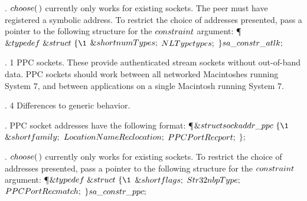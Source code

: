 . \CD{}$\\{choose}(\,)$\DC{} currently only works for existing sockets. The
peer must have registered
a symbolic address. To restrict the choice of addresses presented, pass a
pointer
to the following structure for the \CD{}$\\{constraint}$\DC{} argument:
\Y\P $\&{typedef}\ \&{struct}\ \{\1$\6
$\&{short}\ \\{numTypes};$\5
\6
$\\{NLType}\ \\{types};$\5
\2\6
$\}\ \\{sa\_constr\_atlk};$\par
\fi

. 1 PPC sockets. These provide authenticated stream sockets without
out-of-band
data. PPC sockets should work between all networked Macintoshes running System
7,
and between applications on a single Macintosh running System 7.

\fi

. 4 Differences to generic behavior.

\fi

. PPC socket addresses have the following format:
\Y\P $\&{struct}\ \\{sockaddr\_ppc}\ \{\1$\6
$\&{short}\ \\{family};$\5
\6
$\\{LocationNameRec}\ \\{location};$\5
\6
$\\{PPCPortRec}\ \\{port};$\2\6
$\};$\par
\fi

. \CD{}$\\{choose}(\,)$\DC{} currently only works for existing sockets. To
restrict the choice of
addresses presented, pass a pointer to the following structure for the \CD{}$%
\\{constraint}$\DC{}
argument:
\Y\P $\&{typedef}\ \&{struct}\ \{\1$\6
$\&{short}\ \\{flags};$\6
$\\{Str32}\ \\{nbpType};$\6
$\\{PPCPortRec}\ \\{match};$\2\6
$\}\ \\{sa\_constr\_ppc};$\par
\fi


